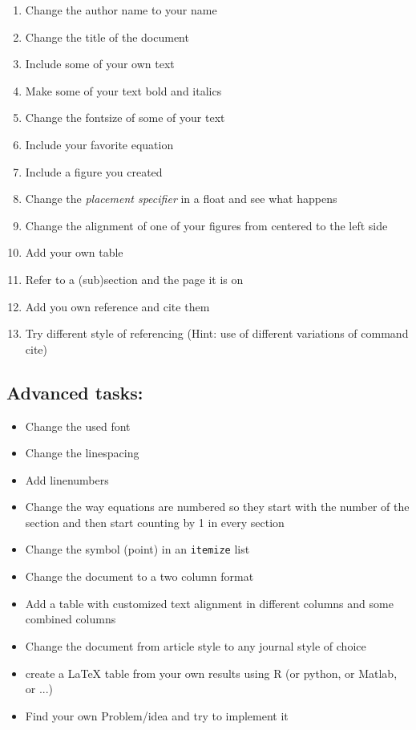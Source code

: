 \documentclass{article}
\begin{document}
\begin{enumerate}
	\item Change the author name to your name
	\item Change the title of the document
    \item Include some of your own text
    \item Make some of your text bold and italics
    \item Change the fontsize of some of your text
    \item Include your favorite equation
    \item Include a figure you created
    \item Change the \textit{placement specifier} in a float and see what happens
    \item Change the alignment of one of your figures from centered to the left side
    \item Add your own table
    \item Refer to a (sub)section and the page it is on
    \item Add you own reference and cite them
    \item Try different style of referencing (Hint: use of different variations of command cite)
\end{enumerate}

\subsection{Advanced tasks:}

\begin{itemize}
    \item Change the used font
\item Change the linespacing
\item Add linenumbers
\item Change the way equations are numbered so they start with the number of the section and then start counting by 1 in every section
\item Change the symbol (point) in an \texttt{itemize} list
\item Change the document to a two column format
\item Add a table with customized text alignment in different columns and some combined columns
\item Change the document from article style to any journal style of choice
\item create a \LaTeX{} table from your own results using R (or python, or Matlab, or ...)
\item Find your own Problem/idea and try to implement it

\end{itemize}



\end{document}
